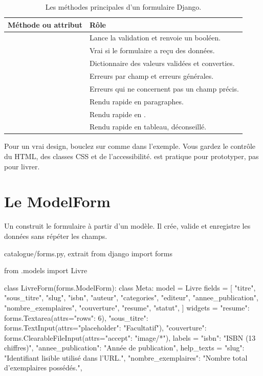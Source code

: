 \begin{table}[htbp]
\centering
\small
\begin{tabularx}{\textwidth}{L{5.2cm} X}
\toprule
\textbf{Méthode ou attribut} & \textbf{Rôle} \\
\midrule
{} & Lance la validation et renvoie un booléen. \\
 & Vrai si le formulaire a reçu des données. \\
 & Dictionnaire des valeurs validées et converties. \\
 & Erreurs par champ et erreurs générales. \\
 & Erreurs qui ne concernent pas un champ précis. \\
 & Rendu rapide en paragraphes. \\
 & Rendu rapide en . \\
 & Rendu rapide en tableau, déconseillé. \\
\bottomrule
\end{tabularx}
\caption{Les méthodes principales d'un formulaire Django.}
\end{table}

\begin{bonne}
Pour un vrai design, bouclez sur  comme dans l'exemple. Vous gardez le
contrôle du HTML, des classes CSS et de l'accessibilité.  est pratique
pour prototyper, pas pour livrer.
\end{bonne}

\section{Le ModelForm}

Un  construit le formulaire à partir d'un modèle. Il crée, valide et
enregistre les données sans répéter les champs.

\begin{codebox}[python]{catalogue/forms.py, extrait}
from django import forms

from .models import Livre


class LivreForm(forms.ModelForm):
    class Meta:
        model = Livre
        fields = [
            "titre",
            "sous_titre",
            "slug",
            "isbn",
            "auteur",
            "categories",
            "editeur",
            "annee_publication",
            "nombre_exemplaires",
            "couverture",
            "resume",
            "statut",
        ]
        widgets = {
            "resume": forms.Textarea(attrs={"rows": 6}),
            "sous_titre": forms.TextInput(attrs={"placeholder": "Facultatif"}),
            "couverture": forms.ClearableFileInput(attrs={"accept": "image/*"}),
        }
        labels = {
            "isbn": "ISBN (13 chiffres)",
            "annee_publication": "Année de publication",
        }
        help_texts = {
            "slug": "Identifiant lisible utilisé dans l'URL.",
            "nombre_exemplaires": "Nombre total d'exemplaires possédés.",
        }
\end{codebox}

